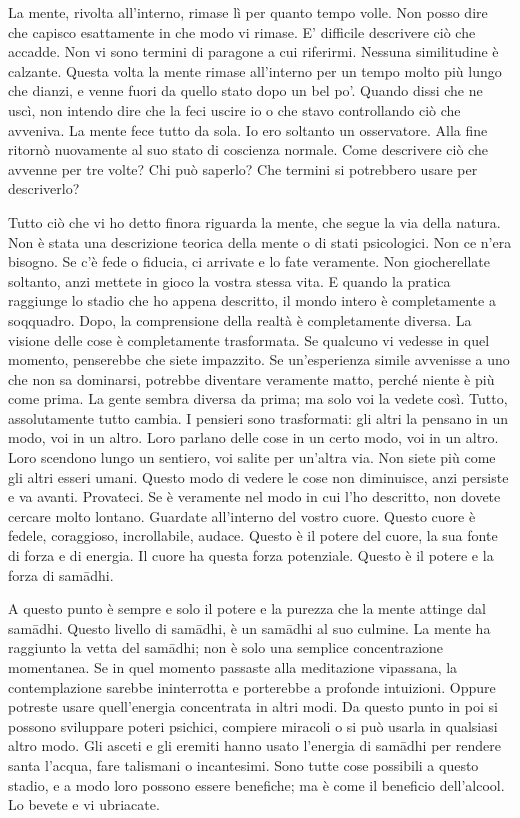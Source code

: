 La mente, rivolta all'interno, rimase lì per quanto tempo volle. Non
posso dire che capisco esattamente in che modo vi rimase. E' difficile
descrivere ciò che accadde. Non vi sono termini di paragone a cui
riferirmi. Nessuna similitudine è calzante. Questa volta la mente rimase
all'interno per un tempo molto più lungo che dianzi, e venne fuori da
quello stato dopo un bel po'. Quando dissi che ne uscì, non intendo dire
che la feci uscire io o che stavo controllando ciò che avveniva. La
mente fece tutto da sola. Io ero soltanto un osservatore. Alla fine
ritornò nuovamente al suo stato di coscienza normale. Come descrivere
ciò che avvenne per tre volte? Chi può saperlo? Che termini si
potrebbero usare per descriverlo?

\clearpage


Tutto ciò che vi ho detto finora riguarda la mente, che segue la via
della natura. Non è stata una descrizione teorica della mente o di stati
psicologici. Non ce n'era bisogno. Se c'è fede o fiducia, ci arrivate e
lo fate veramente. Non giocherellate soltanto, anzi mettete in gioco la
vostra stessa vita. E quando la pratica raggiunge lo stadio che ho
appena descritto, il mondo intero è completamente a soqquadro. Dopo, la
comprensione della realtà è completamente diversa. La visione delle cose
è completamente trasformata. Se qualcuno vi vedesse in quel momento,
penserebbe che siete impazzito. Se un'esperienza simile avvenisse a uno
che non sa dominarsi, potrebbe diventare veramente matto, perché niente
è più come prima. La gente sembra diversa da prima; ma solo voi la
vedete così. Tutto, assolutamente tutto cambia. I pensieri sono
trasformati: gli altri la pensano in un modo, voi in un altro. Loro
parlano delle cose in un certo modo, voi in un altro. Loro scendono
lungo un sentiero, voi salite per un'altra via. Non siete più come gli
altri esseri umani. Questo modo di vedere le cose non diminuisce, anzi
persiste e va avanti. Provateci. Se è veramente nel modo in cui l'ho
descritto, non dovete cercare molto lontano. Guardate all'interno del
vostro cuore. Questo cuore è fedele, coraggioso, incrollabile, audace.
Questo è il potere del cuore, la sua fonte di forza e di energia. Il
cuore ha questa forza potenziale. Questo è il potere e la forza di
samādhi.

A questo punto è sempre e solo il potere e la purezza che la mente
attinge dal samādhi. Questo livello di samādhi, è un samādhi al suo
culmine. La mente ha raggiunto la vetta del samādhi; non è solo una
semplice concentrazione momentanea. Se in quel momento passaste alla
meditazione vipassana, la contemplazione sarebbe ininterrotta e
porterebbe a profonde intuizioni. Oppure potreste usare quell'energia
concentrata in altri modi. Da questo punto in poi si possono sviluppare
poteri psichici, compiere miracoli o si può usarla in qualsiasi altro
modo. Gli asceti e gli eremiti hanno usato l'energia di samādhi per
rendere santa l'acqua, fare talismani o incantesimi. Sono tutte cose
possibili a questo stadio, e a modo loro possono essere benefiche; ma è
come il beneficio dell'alcool. Lo bevete e vi ubriacate.

